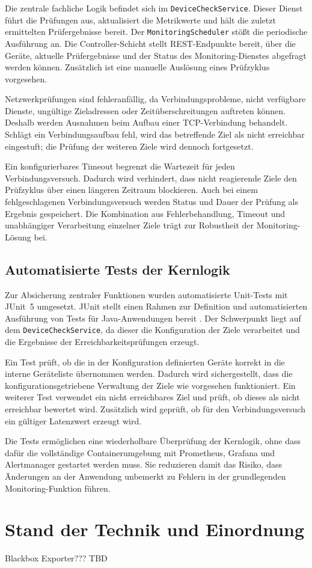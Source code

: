 Die zentrale fachliche Logik befindet sich im \texttt{DeviceCheckService}. Dieser Dienst führt die Prüfungen aus, aktualisiert die Metrikwerte und hält die zuletzt ermittelten Prüfergebnisse bereit. Der \texttt{MonitoringScheduler} stößt die periodische Ausführung an. Die Controller-Schicht stellt REST-Endpunkte bereit, über die Geräte, aktuelle Prüfergebnisse und der Status des Monitoring-Dienstes abgefragt werden können. Zusätzlich ist eine manuelle Auslösung eines Prüfzyklus vorgesehen.

Netzwerkprüfungen sind fehleranfällig, da Verbindungsprobleme, nicht verfügbare Dienste, ungültige Zieladressen oder Zeitüberschreitungen auftreten können. Deshalb werden Ausnahmen beim Aufbau einer TCP-Verbindung behandelt. Schlägt ein Verbindungsaufbau fehl, wird das betreffende Ziel als nicht erreichbar eingestuft; die Prüfung der weiteren Ziele wird dennoch fortgesetzt.

Ein konfigurierbares Timeout begrenzt die Wartezeit für jeden Verbindungsversuch. Dadurch wird verhindert, dass nicht reagierende Ziele den Prüfzyklus über einen längeren Zeitraum blockieren. Auch bei einem fehlgeschlagenen Verbindungsversuch werden Status und Dauer der Prüfung als Ergebnis gespeichert. Die Kombination aus Fehlerbehandlung, Timeout und unabhängiger Verarbeitung einzelner Ziele trägt zur Robustheit der Monitoring-Lösung bei.

\subsection{Automatisierte Tests der Kernlogik}

Zur Absicherung zentraler Funktionen wurden automatisierte Unit-Tests mit JUnit~5 umgesetzt. JUnit stellt einen Rahmen zur Definition und automatisierten Ausführung von Tests für Java-Anwendungen bereit \cite{junit:user-guide}. Der Schwerpunkt liegt auf dem \texttt{DeviceCheckService}, da dieser die Konfiguration der Ziele verarbeitet und die Ergebnisse der Erreichbarkeitsprüfungen erzeugt.

Ein Test prüft, ob die in der Konfiguration definierten Geräte korrekt in die interne Geräteliste übernommen werden. Dadurch wird sichergestellt, dass die konfigurationsgetriebene Verwaltung der Ziele wie vorgesehen funktioniert. Ein weiterer Test verwendet ein nicht erreichbares Ziel und prüft, ob dieses als nicht erreichbar bewertet wird. Zusätzlich wird geprüft, ob für den Verbindungsversuch ein gültiger Latenzwert erzeugt wird.

Die Tests ermöglichen eine wiederholbare Überprüfung der Kernlogik, ohne dass dafür die vollständige Containerumgebung mit Prometheus, Grafana und Alertmanager gestartet werden muss. Sie reduzieren damit das Risiko, dass Änderungen an der Anwendung unbemerkt zu Fehlern in der grundlegenden Monitoring-Funktion führen.

\section{Stand der Technik und Einordnung}

 Blackbox Exporter??? TBD